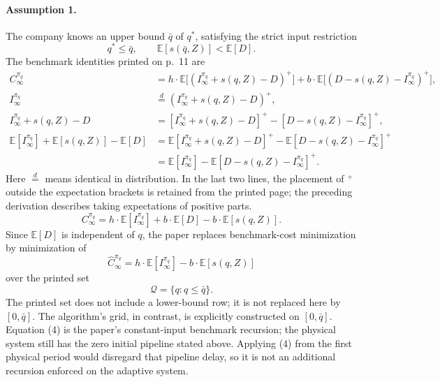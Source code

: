 \documentclass{article}
\begin{document}
\paragraph{Assumption 1.}
The company knows an upper bound \(\bar q\) of \(q^*\), satisfying the strict input restriction
\[
q^*\leq\bar q,\qquad \mathbb{E}[s(\bar q,Z)]<\mathbb{E}[D].
\]
The benchmark identities printed on p.\ 11 are
\begin{align*}
C_\infty^{\pi_q}
&=h\cdot\mathbb{E}\big[(I_\infty^{\pi_q}+s(q,Z)-D)^+\big]
+b\cdot\mathbb{E}\big[(D-s(q,Z)-I_\infty^{\pi_q})^+\big],\\
I_\infty^{\pi_q}
&\overset{d}{=}(I_\infty^{\pi_q}+s(q,Z)-D)^+,\\
I_\infty^{\pi_q}+s(q,Z)-D
&=[I_\infty^{\pi_q}+s(q,Z)-D]^+
-[D-s(q,Z)-I_\infty^{\pi_q}]^+,\\
\mathbb{E}[I_\infty^{\pi_q}]+\mathbb{E}[s(q,Z)]-\mathbb{E}[D]
&=\mathbb{E}[I_\infty^{\pi_q}+s(q,Z)-D]^+
-\mathbb{E}[D-s(q,Z)-I_\infty^{\pi_q}]^+\\
&=\mathbb{E}[I_\infty^{\pi_q}]
-\mathbb{E}[D-s(q,Z)-I_\infty^{\pi_q}]^+.
\end{align*}
Here \(\overset d=\) means identical in distribution. In the last two lines, the placement of \({}^+\) outside the expectation brackets is retained from the printed page; the preceding derivation describes taking expectations of positive parts.
\begin{equation}
C_\infty^{\pi_q}
=h\cdot\mathbb{E}[I_\infty^{\pi_q}]
+b\cdot\mathbb{E}[D]-b\cdot\mathbb{E}[s(q,Z)].\tag{6}
\end{equation}
Since \(\mathbb{E}[D]\) is independent of \(q\), the paper replaces benchmark-cost minimization by minimization of
\begin{equation}
\hat C_\infty^{\pi_q}
=h\cdot\mathbb{E}[I_\infty^{\pi_q}]
-b\cdot\mathbb{E}[s(q,Z)]\tag{7}
\end{equation}
over the printed set
\[
\mathcal Q=\{q:q\leq\bar q\}.
\]
The printed set does not include a lower-bound row; it is not replaced here by \([0,\bar q]\). The algorithm's grid, in contrast, is explicitly constructed on \([0,\bar q]\). Equation (4) is the paper's constant-input benchmark recursion; the physical system still has the zero initial pipeline stated above. Applying (4) from the first physical period would disregard that pipeline delay, so it is not an additional recursion enforced on the adaptive system.
\end{document}
